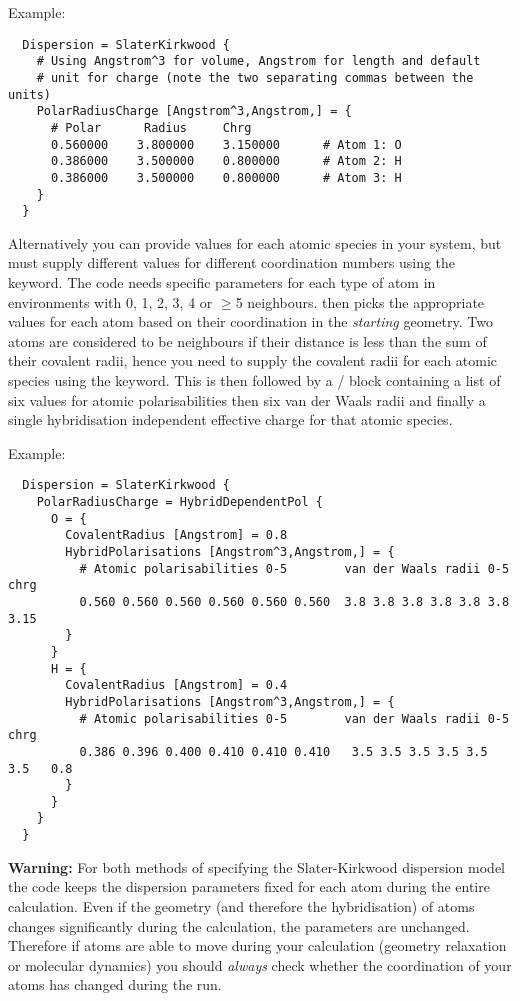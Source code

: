 Example:\invparskip
\begin{verbatim}
  Dispersion = SlaterKirkwood {
    # Using Angstrom^3 for volume, Angstrom for length and default
    # unit for charge (note the two separating commas between the units)
    PolarRadiusCharge [Angstrom^3,Angstrom,] = {
      # Polar      Radius     Chrg
      0.560000    3.800000    3.150000      # Atom 1: O
      0.386000    3.500000    0.800000      # Atom 2: H
      0.386000    3.500000    0.800000      # Atom 3: H
    }
  }
\end{verbatim}

Alternatively you can provide values for each atomic species in your system, but
must supply different values for different coordination numbers using the
 keyword. The code needs specific parameters for each
type of atom in environments with 0, 1, 2, 3, 4 or $\geqslant$5
neighbours. \dftbp{} then picks the appropriate values for each atom based on
their coordination in the \emph{starting} geometry.  Two atoms are considered to
be neighbours if their distance is less than the sum of their covalent radii,
hence you need to supply the covalent radii for each atomic species using the
 keyword. This is then followed by a 
/  block containing a list of six values for atomic
polarisabilities then six van der Waals radii and finally a single hybridisation
independent effective charge for that atomic species.

Example:\invparskip
\begin{verbatim}
  Dispersion = SlaterKirkwood {
    PolarRadiusCharge = HybridDependentPol {
      O = {
        CovalentRadius [Angstrom] = 0.8
        HybridPolarisations [Angstrom^3,Angstrom,] = {
          # Atomic polarisabilities 0-5        van der Waals radii 0-5  chrg
          0.560 0.560 0.560 0.560 0.560 0.560  3.8 3.8 3.8 3.8 3.8 3.8  3.15
        }
      }
      H = {
        CovalentRadius [Angstrom] = 0.4
        HybridPolarisations [Angstrom^3,Angstrom,] = {
          # Atomic polarisabilities 0-5        van der Waals radii 0-5  chrg
          0.386 0.396 0.400 0.410 0.410 0.410   3.5 3.5 3.5 3.5 3.5 3.5   0.8
        }
      }
    }
  }
\end{verbatim}

\textbf{Warning:} For both methods of specifying the Slater-Kirkwood dispersion model the code keeps
the dispersion parameters fixed for each atom during the entire calculation. Even if the geometry
(and therefore the hybridisation) of atoms changes significantly during the calculation, the
parameters are unchanged. Therefore if atoms are able to move during your calculation (geometry
relaxation or molecular dynamics) you should \emph{always} check whether the coordination of your
atoms has changed during the run.

